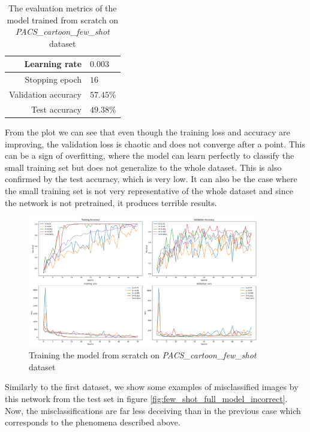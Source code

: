 \documentclass[a4paper,11pt]{article}
\begin{document}
\begin{table}[ht]
    \centering
    \begin{tabular}{ | r | l | }
        \hline
        Learning rate       & $0.003$   \\
        \hline
        Stopping epoch      & $16$      \\
        \hline
        Validation accuracy & $57.45\%$ \\
        \hline
        Test accuracy       & $49.38\%$ \\
        \hline
    \end{tabular}
    \caption{The evaluation metrics of the model trained from scratch on \textit{PACS\_cartoon\_few\_shot} dataset}
    \label{table:few_shot_full_model_acc}
\end{table}

From the plot we can see that even though the training loss and accuracy are improving, the validation loss is chaotic and does not converge after a point.
This can be a sign of overfitting, where the model can learn perfectly to classify the small training set but does not generalize to the whole dataset.
This is also confirmed by the test accuracy, which is very low.
It can also be the case where the small training set is not very representative of the whole dataset and since the network is not pretrained, it produces terrible results.

\begin{figure}[ht]
    \centering
    \includegraphics[width=0.9\textwidth]{../out/few_shot_full_model.png}
    \caption{Training the model from scratch on \textit{PACS\_cartoon\_few\_shot} dataset}
    \label{fig:few_shot_scratch}
\end{figure}

Similarly to the first dataset, we show some examples of misclassified images by this network from the test set in figure \ref{fig:few_shot_full_model_incorrect}.
Now, the misclassifications are far less deceiving than in the previous case which corresponds to the phenomena described above.
\end{document}
